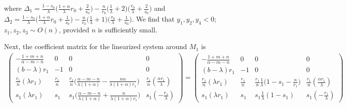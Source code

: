 \documentclass[usletter,11pt]{article}
\def\BO{{{O}}}
\theoremstyle{remark}
\begin{document}
where $\Delta_1 = \frac{1-s_0}{\lambda}\big(\frac{1+\alpha}{\lambda}r_0 + \frac{2}{s_0}\big) -\frac{n}{r_0} \big( \frac{1}{\lambda} + 2\big)\big(\frac{r_0}{\lambda} + \frac{2}{s_0}\big)$
and $\Delta_2 = \frac{1-s_0}{\lambda}\big(\frac{1+\alpha}{\lambda}r_0 + \frac{1}{s_0}\big) -\frac{n}{r_0} \big( \frac{1}{\lambda} + 1\big)\big(\frac{r_0}{\lambda} + \frac{1}{s_0}\big)$.
We find that $y_1,y_2,y_4<0$; $z_1,z_2,z_3 \sim\BO(n)$, provided $n$ is sufficiently small.

Next, the coefficient matrix for the linearized system around $M_1$ is
\begin{align*}
 \begin{pmatrix}
          -\frac{1+m+n}{\alpha-m-n} & 0 & 0 & 0\\
          (b-\lambda)r_1 & -1 & 0 & 0\\
          \frac{r_1}{n}(\lambda r_1) & \frac{r_1}{n} & \frac{r_1}{n}\Big(\frac{\alpha-m-n}{\lambda(1+\alpha)} - \frac{n\alpha}{\lambda(1+\alpha)r_1}\Big) & \frac{r_1}{n}(\frac{\alpha r_1}{\lambda})\\
          s_1(\lambda r_1) & s_1 & s_1\Big(\frac{\alpha-m-n}{\lambda(1+\alpha)} + \frac{n}{\lambda(1+\alpha)r_1}\Big) & s_1(-\frac{r_1}{\lambda})
         \end{pmatrix}
         =\begin{pmatrix}
          -\frac{1+m+n}{\alpha-m-n} & 0 & 0 & 0\\
          (b-\lambda)r_1 & -1 & 0 & 0\\
          \frac{r_1}{n}(\lambda r_1) & \frac{r_1}{n} & \frac{r_1}{n}\frac{1}{\lambda}\Big(1-s_1-\frac{n}{r_1}\Big) & \frac{r_1}{n}(\frac{\alpha r_1}{\lambda})\\
          s_1(\lambda r_1) & s_1 & s_1\frac{1}{\lambda}(1-s_1) & s_1(-\frac{r_1}{\lambda})
         \end{pmatrix}
\end{align*}
\end{document}
